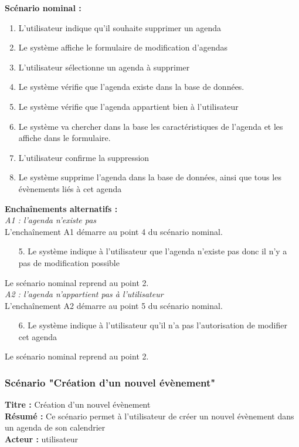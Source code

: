 \documentclass[12pt , a4paper]{article}
\begin{document}
\noindent\textbf{Scénario nominal :}
\begin{enumerate}
\item L’utilisateur indique qu'il souhaite supprimer un agenda
\item Le système affiche le formulaire de modification d’agendas
\item L’utilisateur sélectionne un agenda à supprimer
\item Le système vérifie que l’agenda existe dans la base de données.
\item Le système vérifie que l’agenda appartient bien à l’utilisateur
\item Le système va chercher dans la base les caractéristiques de l’agenda et les affiche dans le formulaire.
\item L’utilisateur confirme la suppression
\item Le système supprime l’agenda dans la base de données, ainsi que tous les évènements liés à cet agenda \\
\end{enumerate}

\noindent\textbf{Encha\^inements alternatifs :}\\
\noindent\textit{A1 : l’agenda n’existe pas}\\
L'encha\^inement A1 démarre au point 4 du scénario nominal.
\begin{enumerate}
\item[5.] Le système indique à l’utilisateur que l’agenda n’existe pas donc il n’y a pas de modification possible
\end{enumerate}
Le scénario nominal reprend au point 2.\\


\noindent\textit{A2 : l’agenda n’appartient pas à l’utilisateur}\\
L'encha\^inement A2 démarre au point 5 du scénario nominal.
\begin{enumerate}
\item[6.] Le système indique à l’utilisateur qu’il n’a pas l’autorisation de modifier cet agenda
\end{enumerate}
Le scénario nominal reprend au point 2.\\


\subsubsection{Scénario "Création d’un nouvel évènement"}
\noindent\textbf{Titre : } Création d’un nouvel évènement\\
\textbf{Résumé : } Ce scénario permet à l’utilisateur de créer un nouvel évènement dans un agenda de son calendrier\\
\textbf{Acteur : }utilisateur\\
\end{document}
